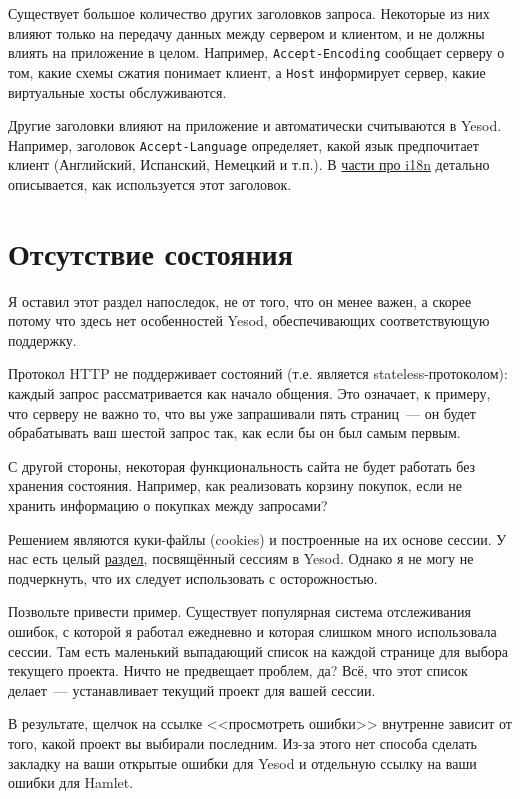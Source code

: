 Существует большое количество других заголовков запроса. Некоторые из них влияют только на
передачу данных между сервером и клиентом, и не должны влиять на приложение в целом.
Например, \verb*|Accept-Encoding| сообщает серверу о том, какие схемы сжатия понимает
клиент, а \verb*|Host| информирует сервер, какие виртуальные хосты обслуживаются.

Другие заголовки влияют на приложение и автоматически считываются в Yesod. Например,
заголовок \verb*|Accept-Language| определяет, какой язык предпочитает клиент (Английский,
Испанский, Немецкий и т.п.). В
\hyperref[chap:i18n]{части про i18n} детально описывается, как используется этот
заголовок.

\section{Отсутствие состояния}

Я оставил этот раздел напоследок, не от того, что он менее важен, а скорее потому что
здесь нет особенностей Yesod, обеспечивающих соответствующую поддержку.

Протокол HTTP не поддерживает состояний (т.е. является stateless-протоколом): каждый
запрос рассматривается
как начало общения. Это означает, к примеру, что серверу не важно то, что вы уже
запрашивали пять страниц~--- он будет обрабатывать ваш шестой запрос так, как если бы он
был самым первым.

С другой стороны, некоторая функциональность сайта не будет работать без хранения состояния. Например, как реализовать корзину покупок, если не хранить информацию о покупках между запросами?

Решением являются куки-файлы (cookies) и построенные на их основе сессии. У нас есть
целый
\hyperref[chap:sessions]{раздел}, посвящённый сессиям в Yesod. Однако я не могу не
подчеркнуть, что их следует использовать с осторожностью.

Позвольте привести пример. Существует популярная система отслеживания ошибок, с которой я
работал ежедневно и которая слишком много использовала сессии. Там есть маленький
выпадающий список на каждой странице для выбора текущего проекта. Ничто не предвещает
проблем, да? Всё, что этот список делает~--- устанавливает текущий проект для вашей
сессии.

В результате, щелчок на ссылке <<просмотреть ошибки>> внутренне зависит от того, какой
проект вы выбирали последним. Из-за этого нет способа сделать закладку на ваши открытые
ошибки для Yesod и отдельную ссылку на ваши ошибки для Hamlet.

